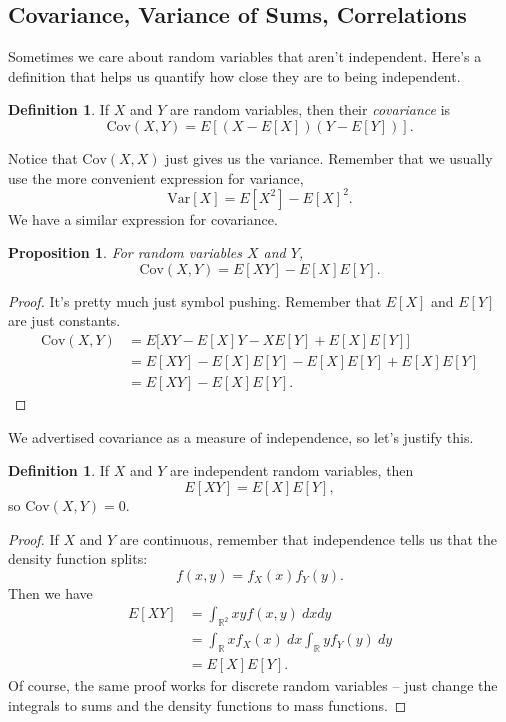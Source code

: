 \documentclass[12pt]{article}
\theoremstyle{plain}
\newtheorem{proposition}[theorem]{Proposition}
\theoremstyle{definition}
\newtheorem{definition}[theorem]{Definition}
\theoremstyle{remark}
\newcommand{\Var}{\ensuremath{\textrm{Var}}}
\newcommand{\Cov}{\ensuremath{\textrm{Cov}}}
\newcommand{\R}{\mathbb{R}}
\begin{document}
\subsection{Covariance, Variance of Sums, Correlations}
Sometimes we care about random variables that aren't independent.
Here's a definition that helps us quantify how close they are to being independent.

\begin{definition}
    If $X$ and $Y$ are random variables, then their \emph{covariance} is
    \[
        \Cov(X,Y) = E[(X-E[X])(Y - E[Y])].
    \]
\end{definition}
Notice that $\Cov(X,X)$ just gives us the variance.
Remember that we usually use the more convenient expression for variance,
\[
    \Var[X] = E[X^2] - E[X]^2.
\]
We have a similar expression for covariance.
\begin{proposition}
    For random variables $X$ and $Y$,
    \[
        \Cov(X,Y) = E[XY]-E[X]E[Y].
    \]
\end{proposition}
\begin{proof}
    It's pretty much just symbol pushing.
    Remember that $E[X]$ and $E[Y]$ are just constants.
    \begin{align*}
        \Cov(X,Y) &= E\big[XY - E[X]Y - XE[Y] + E[X]E[Y]\big]\\
        &= E[XY]-E[X]E[Y]-E[X]E[Y] + E[X]E[Y]\\
        &= E[XY] - E[X]E[Y].
    \end{align*}
\end{proof}

We advertised covariance as a measure of independence, so let's justify this.
\begin{definition}
    If $X$ and $Y$ are independent random variables, then
    \[
        E[XY] = E[X]E[Y],
    \]
    so $\Cov(X,Y) = 0$.
\end{definition}
\begin{proof}
    If $X$ and $Y$ are continuous, remember that independence tells us that the density function splits:
    \[
        f(x,y) = f_X(x)f_Y(y).
    \]
    Then we have
    \begin{align*}
        E[XY] &= \int_{\R^2}xyf(x,y)\ dxdy\\
        &= \int_{\R}xf_X(x)\ dx\int_{\R}yf_Y(y)\ dy\\
        &= E[X]E[Y].
    \end{align*}
    Of course, the same proof works for discrete random variables -- just change the integrals to sums and the density functions to mass functions.
\end{proof}
\end{document}

